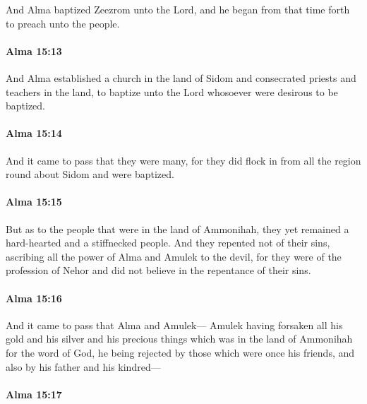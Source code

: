 			And Alma baptized Zeezrom unto the Lord,
			and he began from that time forth to preach unto the people.

		\paragraph{Alma 15:13} %
			\label{ALMA-15-13}

			And Alma established a church in the land of Sidom
			and consecrated priests and teachers in the land,
			to baptize unto the Lord whosoever were desirous to be baptized.

		\paragraph{Alma 15:14} %
			\label{ALMA-15-14}

			And it came to pass that they were many,
			for they did flock in from all the region round about Sidom and were baptized.

		\paragraph{Alma 15:15} %
			\label{ALMA-15-15}

			But as to the people that were in the land of Ammonihah,
			they yet remained a hard-hearted and a stiffnecked people.
			And they repented not of their sins,
			ascribing all the power of Alma and Amulek to the devil,
			for they were of the profession of Nehor
			and did not believe in the repentance of their sins.

		\paragraph{Alma 15:16} %
			\label{ALMA-15-16}

			And it came to pass that Alma and Amulek---
			Amulek having forsaken all his gold and his silver
			and his precious things which was in the land of Ammonihah
			for the word of God,
			he being rejected by those which were once his friends,
			and also by his father and his kindred---

		\paragraph{Alma 15:17} %
			\label{ALMA-15-17}

